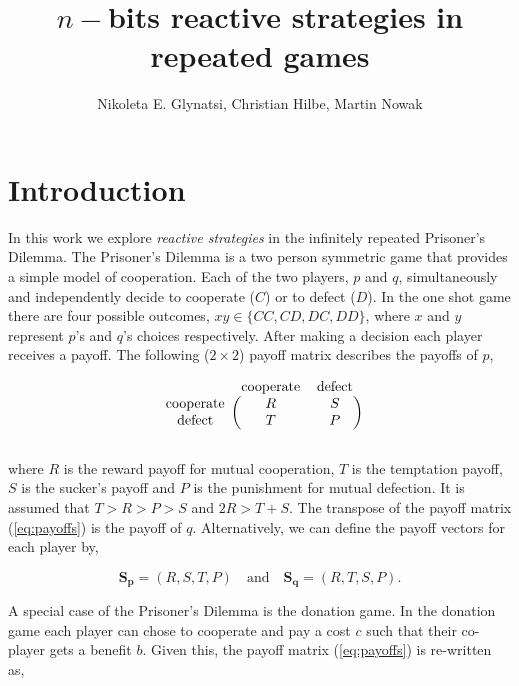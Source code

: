 \documentclass{article}
\title{$n-$bits reactive strategies in repeated games}
\author{Nikoleta E. Glynatsi, Christian Hilbe, Martin Nowak}
\date{}
\theoremstyle{definition}
\begin{document}
\maketitle

\section{Introduction}

In this work we explore \textit{reactive strategies} in the infinitely repeated
Prisoner's Dilemma. The Prisoner's Dilemma is a two person symmetric game that
provides a simple model of cooperation. Each of the two players, \(p\)
and \(q\), simultaneously and independently decide to cooperate (\(C\)) or to defect
(\(D\)). In the one shot game there are four possible outcomes, \(xy \in \{CC, CD, DC, DD\}\), where
\(x\) and \(y\) represent \(p\)'s and \(q\)'s choices respectively. After making
a decision each player receives a payoff. The following (\(2 \times 2\)) payoff
matrix describes the payoffs of \(p\),

\begin{equation}\label{eq:payoffs}
    \begin{blockarray}{ccc}
        & \text{cooperate} & \text{defect} \\
        \begin{block}{c(cc)}
            \text{cooperate} & R & S \\
            \text{defect} & T & P \\
        \end{block}
    \end{blockarray}
\end{equation}

where \(R\) is the reward payoff for mutual cooperation, \(T\) is the temptation
payoff, \(S\) is the sucker's payoff and \(P\) is the punishment for mutual
defection. It is assumed that \(T > R > P > S\) and \(2R > T + S\). The
transpose of the payoff matrix (\ref{eq:payoffs}) is the payoff of \(q\).
Alternatively, we can define the payoff vectors for each player by,

\begin{equation}\label{eq:vector_payoffs}
  \mathbf{S_{p}} = (R, S, T, P) \quad \textrm{and} \quad \mathbf{S_{q}} = (R, T, S, P).
\end{equation}

A special case of the Prisoner's Dilemma is the donation game. In the donation
game each player can chose to cooperate and pay a cost \(c\) such that their
co-player gets a benefit \(b\). Given this, the payoff matrix (\ref{eq:payoffs})
is re-written as,
\end{document}
